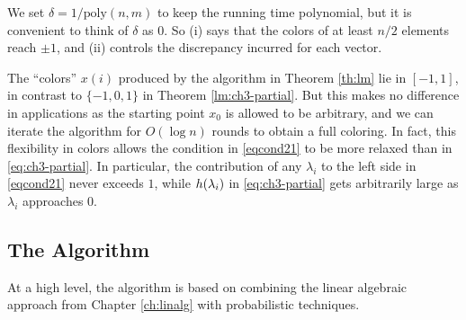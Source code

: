 \begin{remark} We set $\delta = 1/\text{poly}(n,m)$ to keep the running time polynomial, 
 but it is convenient to think of $\delta$ as $0$. So (i) says that the colors of at least $n/2$ elements reach $\pm 1$, and (ii) controls the discrepancy incurred for each vector.
 
The ``colors'' $x(i)$ produced by the algorithm in Theorem \ref{th:lm} lie in $[-1,1]$, in contrast to $\{-1,0,1\}$ in Theorem \ref{lm:ch3-partial}. 
But this makes no difference in applications as the starting point $x_0$ is allowed to be arbitrary, and we can iterate the algorithm for $O(\log n)$ rounds to obtain a full coloring.
In fact, this flexibility in colors allows the condition in \eqref{eqcond21} to be more relaxed than in \eqref{eq:ch3-partial}. In particular, the contribution of any $\lambda_i$ to the left side in \eqref{eqcond21} never exceeds $1$, while $h(\lambda_i)$ in \eqref{eq:ch3-partial} gets arbitrarily large as $\lambda_i$ approaches $0$.
\end{remark}







\subsection{The Algorithm}
At a high level, the algorithm is based on combining the linear algebraic approach from  Chapter \ref{ch:linalg} with probabilistic techniques.

